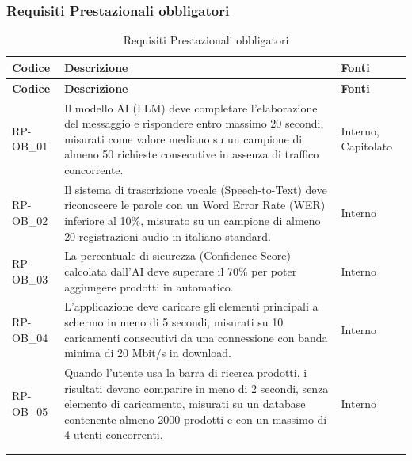 \subsubsection{Requisiti Prestazionali obbligatori}
\renewcommand{\arraystretch}{1.15}
\begin{longtable}{|>{\raggedright}p{}|>{\raggedright\arraybackslash}p{}|>{\raggedright\arraybackslash}p{}|}
    \hline
    \rowcolor[gray]{0.9}
    \textbf{Codice} & \textbf{Descrizione} & \textbf{Fonti} \\
    \hline
    \endfirsthead
    \hline
    \rowcolor[gray]{0.9}
    \textbf{Codice} & \textbf{Descrizione} & \textbf{Fonti} \\
    \hline
    \endhead
    \hline
    RP-OB\_01 \hypertarget{rp-ob_1} & Il modello AI (LLM) deve completare l'elaborazione del messaggio e rispondere entro massimo 20 secondi, misurati come valore mediano su un campione di almeno 50 richieste consecutive in assenza di traffico concorrente. & Interno, Capitolato \\
    \hline
    RP-OB\_02 \hypertarget{rp-ob_2} & Il sistema di trascrizione vocale (Speech-to-Text) deve riconoscere le parole con un Word Error Rate (WER) inferiore al 10\%, misurato su un campione di almeno 20 registrazioni audio in italiano standard. & Interno \\
    \hline
    RP-OB\_03 \hypertarget{rp-ob_3} & La percentuale di sicurezza (Confidence Score) calcolata dall'AI deve superare il 70\% per poter aggiungere prodotti in automatico. & Interno \\
    \hline
    RP-OB\_04 \hypertarget{rp-ob_4} & L'applicazione deve caricare gli elementi principali a schermo in meno di 5 secondi, misurati su 10 caricamenti consecutivi da una connessione con banda minima di 20 Mbit/s in download. & Interno \\
    \hline
    RP-OB\_05 \hypertarget{rp-ob_5} & Quando l'utente usa la barra di ricerca prodotti, i risultati devono comparire in meno di 2 secondi, senza elemento di caricamento, misurati su un database contenente almeno 2000 prodotti e con un massimo di 4 utenti concorrenti. & Interno \\
    \hline
    \multicolumn{3}{c}{} \\
    \caption{Requisiti Prestazionali obbligatori}\hypertarget{tab:prestazionali_obbligatori}\\
\end{longtable}

